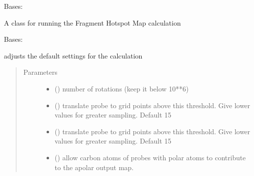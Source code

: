 \documentclass[letterpaper,10pt,english]{sphinxmanual}
\begin{document}
\begin{fulllineitems}
\label{\detokenize{calculation_api:hotspots.calculation.Runner}}
Bases: 

A class for running the Fragment Hotspot Map calculation

\begin{fulllineitems}
\label{\detokenize{calculation_api:hotspots.calculation.Runner.Settings}}
Bases: 

adjusts the default settings for the calculation
\begin{quote}\begin{description}
\item[{Parameters}] \leavevmode\begin{itemize}
\item {} 
 () \textendash{} number of rotations (keep it below 10**6)

\item {} 
 () \textendash{} translate probe to grid points above this threshold. Give lower values for greater sampling. Default 15

\item {} 
 () \textendash{} translate probe to grid points above this threshold. Give lower values for greater sampling. Default 15

\item {} 
 () \textendash{} allow carbon atoms of probes with polar atoms to contribute to the apolar output map.


\end{itemize}
\end{description}
\end{quote}
\end{fulllineitems}
\end{fulllineitems}
\end{document}
